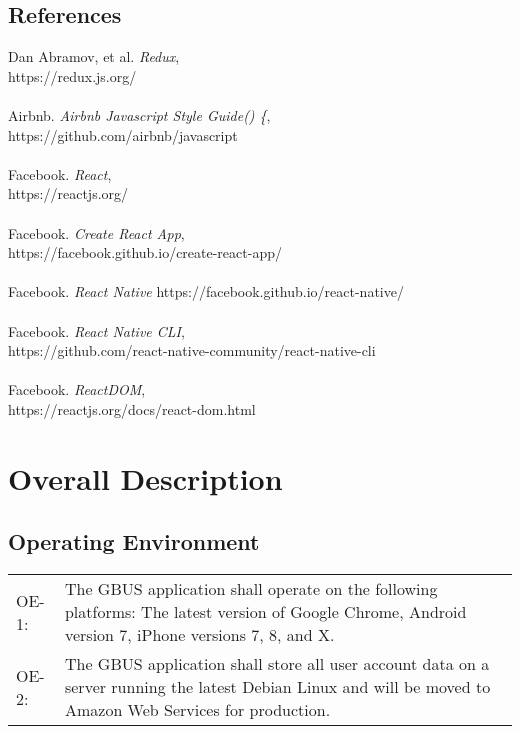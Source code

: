 \documentclass{scrreprt}
\begin{document}
\section{References}
Dan Abramov, et al. \textit{Redux}, \\
https://redux.js.org/\\
\\
Airbnb. \textit{Airbnb Javascript Style Guide() \{}, \\
https://github.com/airbnb/javascript\\
\\
Facebook. \textit{React}, \\
https://reactjs.org/\\
\\
Facebook. \textit{Create React App}, \\
https://facebook.github.io/create-react-app/\\
\\
Facebook. \textit{React Native}
https://facebook.github.io/react-native/\\
\\
Facebook. \textit{React Native CLI}, \\
https://github.com/react-native-community/react-native-cli\\
\\
Facebook. \textit{ReactDOM}, \\
https://reactjs.org/docs/react-dom.html\\


\chapter{Overall Description}

\section{Operating Environment}
\begin{center}
\begin{longtable}{ p{1cm} p{14cm} }
OE-1: & The GBUS application shall operate on the following platforms: The latest version of Google Chrome, Android version 7, iPhone versions 7, 8, and X. \\
OE-2: & The GBUS application shall store all user account data on a server running the latest Debian Linux and will be moved to Amazon Web Services for production. \\
\end{longtable}
\end{center}
\end{document}
